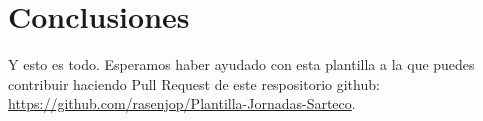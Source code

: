 \section{Conclusiones}

Y esto es todo. Esperamos haber ayudado con esta plantilla a la que puedes
contribuir haciendo Pull Request de este respositorio github:
\url{https://github.com/rasenjop/Plantilla-Jornadas-Sarteco}.